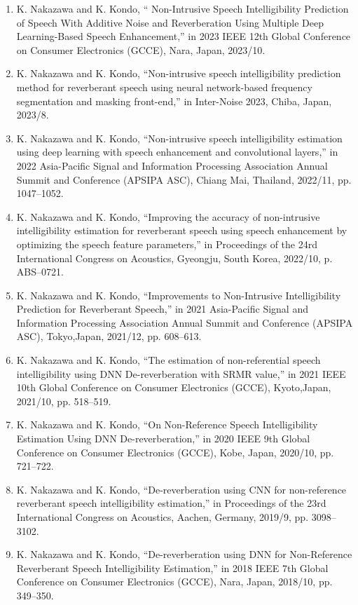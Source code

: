 \documentclass[uplatex,dvipdfmx,a4paper,11pt]{jsreport}
\begin{document}
\begin{enumerate}

\item K. Nakazawa and K. Kondo, “ Non-Intrusive Speech Intelligibility Prediction of Speech With Additive Noise and Reverberation Using Multiple Deep Learning-Based Speech Enhancement,” in 2023 IEEE 12th Global Conference on Consumer Electronics (GCCE), Nara, Japan, 2023/10.

\item K. Nakazawa and K. Kondo, “Non-intrusive speech intelligibility prediction method for reverberant speech using neural network-based frequency segmentation and masking front-end,” in Inter-Noise 2023, Chiba, Japan, 2023/8.


\item K. Nakazawa and K. Kondo, “Non-intrusive speech intelligibility estimation using deep learning with speech enhancement and convolutional layers,” in 2022 Asia-Pacific Signal and Information Processing Association Annual Summit and Conference (APSIPA ASC), Chiang Mai, Thailand, 2022/11, pp. 1047–1052.

\item K. Nakazawa and K. Kondo, “Improving the accuracy of non-intrusive intelligibility estimation for reverberant speech using speech enhancement by optimizing the speech feature parameters,” in Proceedings of the 24rd International Congress on Acoustics, Gyeongju, South Korea, 2022/10, p. ABS–0721.

\item K. Nakazawa and K. Kondo, “Improvements to Non-Intrusive Intelligibility Prediction for Reverberant Speech,” in 2021 Asia-Pacific Signal and Information Processing Association Annual Summit and Conference (APSIPA ASC), Tokyo,Japan, 2021/12, pp. 608–613.

\item K. Nakazawa and K. Kondo, “The estimation of non-referential speech intelligibility using DNN De-reverberation with SRMR value,” in 2021 IEEE 10th Global Conference on Consumer Electronics (GCCE), Kyoto,Japan, 2021/10, pp. 518–519.

\item K. Nakazawa and K. Kondo, “On Non-Reference Speech Intelligibility Estimation Using DNN De-reverberation,” in 2020 IEEE 9th Global Conference on Consumer Electronics (GCCE), Kobe, Japan, 2020/10, pp. 721–722.

\item K. Nakazawa and K. Kondo, “De-reverberation using CNN for non-reference reverberant speech intelligibility estimation,” in Proceedings of the 23rd International Congress on Acoustics, Aachen, Germany, 2019/9, pp. 3098–3102.

\item K. Nakazawa and K. Kondo, “De-reverberation using DNN for Non-Reference Reverberant Speech Intelligibility Estimation,” in 2018 IEEE 7th Global Conference on Consumer Electronics (GCCE), Nara, Japan, 2018/10, pp. 349–350.

\end{enumerate}
\end{document}
